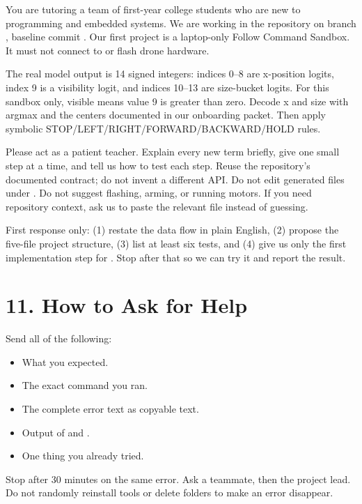 \documentclass[11pt]{article}
\begin{document}
\begin{graybox}
\small
You are tutoring a team of first-year college students who are new to programming and embedded systems. We are working in the  repository on branch , baseline commit . Our first project is a laptop-only Follow Command Sandbox. It must not connect to or flash drone hardware.

The real model output is 14 signed integers: indices 0--8 are x-position logits, index 9 is a visibility logit, and indices 10--13 are size-bucket logits. For this sandbox only, visible means value 9 is greater than zero. Decode x and size with argmax and the centers documented in our onboarding packet. Then apply symbolic STOP/LEFT/RIGHT/FORWARD/BACKWARD/HOLD rules.

Please act as a patient teacher. Explain every new term briefly, give one small step at a time, and tell us how to test each step. Reuse the repository's documented contract; do not invent a different API. Do not edit generated files under . Do not suggest flashing, arming, or running motors. If you need repository context, ask us to paste the relevant file instead of guessing.

First response only: (1) restate the data flow in plain English, (2) propose the five-file project structure, (3) list at least six tests, and (4) give us only the first implementation step for . Stop after that so we can try it and report the result.
\end{graybox}

\section{11. How to Ask for Help}

Send all of the following:

\begin{itemize}
\item What you expected.
\item The exact command you ran.
\item The complete error text as copyable text.
\item Output of  and .
\item One thing you already tried.
\end{itemize}

Stop after 30 minutes on the same error. Ask a teammate, then the project lead. Do not randomly reinstall tools or delete folders to make an error disappear.
\end{document}
